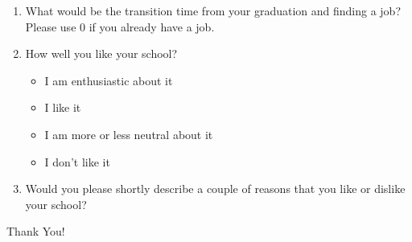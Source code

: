 \documentclass[12pt,a4paper,titlepage]{article}
\begin{document}
\begin{enumerate}
	\item What would be the transition time from your graduation and finding a job? Please use 0 if you already have a job.
	
	\item How well you like your school?
	\begin{itemize}
		\item I am enthusiastic about it
		\item I like it
		\item I am more or less neutral about it
		\item I don't like it
	\end{itemize}
	
	\item Would you please shortly describe a couple of reasons that you like or dislike your school?
	
\end{enumerate}

Thank You!
\end{document}
